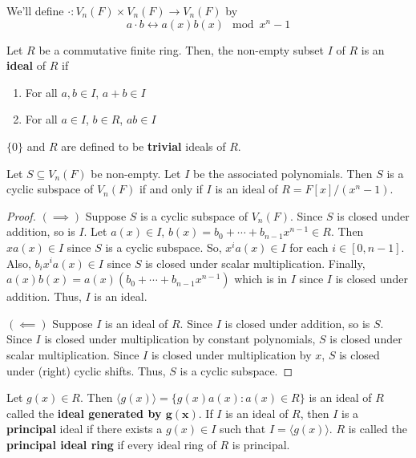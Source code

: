 We'll define $ \cdot : V_n(F)\times V_n(F)\to V_n(F) $
by
\[ a\cdot b \longleftrightarrow a(x)b(x)\mod x^n-1 \]

\begin{defbox}
    \begin{definition}
        Let $ R $ be a commutative finite ring. Then, the non-empty
        subset $ I $ of $ R $ is an \textbf{ideal} of $ R $ if
        \begin{enumerate}[(1)]
            \item For all $ a,b\in I $, $ a+b\in I $
            \item For all $ a\in I $, $ b\in R $, $ ab\in I $
        \end{enumerate}
        $ \{0\} $ and $ R $ are defined to be \textbf{trivial} ideals of $ R $.
    \end{definition}
\end{defbox}

\begin{thmbox}
    \begin{theorem}
        Let $ S\subseteq V_n(F) $ be non-empty. Let $ I $ be the associated polynomials.
        Then $ S $ is a cyclic subspace of $ V_n(F) $ if and only if $ I $
        is an ideal of $ R=F[x]/(x^n-1) $.
    \end{theorem}
\end{thmbox}

\begin{proof}
    $ (\implies) $ Suppose $ S $ is a cyclic subspace of $ V_n(F) $.
    Since $ S $ is closed under addition, so is $ I $.
    Let $ a(x)\in I $, $ b(x)=b_0+\cdots+b_{n-1}x^{n-1}\in R $.
    Then $ xa(x)\in I $ since $ S $ is a cyclic subspace. So,
    $ x^ia(x)\in I $ for each $ i\in [0,n-1] $. Also,
    $ b_i x^i a(x)\in I $ since $ S $ is closed under scalar multiplication.
    Finally, $ a(x)b(x)=a(x)(b_0+\cdots+b_{n-1}x^{n-1}) $ which is in $ I $
    since $ I $ is closed under addition. Thus, $ I $ is an ideal.

    $ (\impliedby) $ Suppose $ I $ is an ideal of $ R $. Since $ I $
    is closed under addition, so is $ S $. Since $ I $ is closed
    under multiplication by constant polynomials, $ S $ is closed
    under scalar multiplication. Since $ I $ is closed under
    multiplication by $ x $, $ S $ is closed under (right) cyclic shifts.
    Thus, $ S $ is a cyclic subspace.
\end{proof}

\begin{defbox}
    \begin{definition}
        Let $ g(x)\in R $. Then $ \langle g(x) \rangle = \{g(x)a(x):a(x)\in R\} $
        is an ideal of $ R $ called the \textbf{ideal generated by $\bm{g(x)}$}.
        If $ I $ is an ideal of $ R $, then $ I $ is a \textbf{principal}
        ideal if there exists a $ g(x)\in I $ such that $ I= \langle g(x) \rangle $.
        $ R $ is called the \textbf{principal ideal ring} if every ideal
        ring of $ R $ is principal.
    \end{definition}
\end{defbox}


